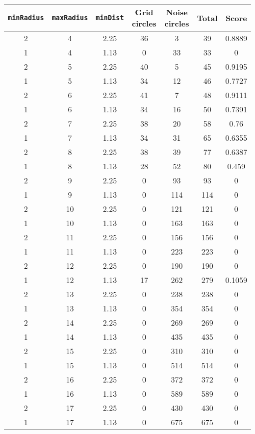 \documentclass[letterpaper, 12pt]{article}
\begin{document}
\begin{longtable}{|c|c|c|c|c|c|c|}
\hline
\textbf{\texttt{minRadius}} & \textbf{\texttt{maxRadius}} & \textbf{\texttt{minDist}} & \textbf{Grid circles} & \textbf{Noise circles} & \textbf{Total} & \textbf{Score} \\
\hline
2 & 4 & 2.25 & 36 & 3 & 39 & 0.8889 \\
\hline
1 & 4 & 1.13 & 0 & 33 & 33 & 0 \\
\hline
2 & 5 & 2.25 & 40 & 5 & 45 & 0.9195 \\
\hline
1 & 5 & 1.13 & 34 & 12 & 46 & 0.7727 \\
\hline
2 & 6 & 2.25 & 41 & 7 & 48 & 0.9111 \\
\hline
1 & 6 & 1.13 & 34 & 16 & 50 & 0.7391 \\
\hline
2 & 7 & 2.25 & 38 & 20 & 58 & 0.76 \\
\hline
1 & 7 & 1.13 & 34 & 31 & 65 & 0.6355 \\
\hline
2 & 8 & 2.25 & 38 & 39 & 77 & 0.6387 \\
\hline
1 & 8 & 1.13 & 28 & 52 & 80 & 0.459 \\
\hline
2 & 9 & 2.25 & 0 & 93 & 93 & 0 \\
\hline
1 & 9 & 1.13 & 0 & 114 & 114 & 0 \\
\hline
2 & 10 & 2.25 & 0 & 121 & 121 & 0 \\
\hline
1 & 10 & 1.13 & 0 & 163 & 163 & 0 \\
\hline
2 & 11 & 2.25 & 0 & 156 & 156 & 0 \\
\hline
1 & 11 & 1.13 & 0 & 223 & 223 & 0 \\
\hline
2 & 12 & 2.25 & 0 & 190 & 190 & 0 \\
\hline
1 & 12 & 1.13 & 17 & 262 & 279 & 0.1059 \\
\hline
2 & 13 & 2.25 & 0 & 238 & 238 & 0 \\
\hline
1 & 13 & 1.13 & 0 & 354 & 354 & 0 \\
\hline
2 & 14 & 2.25 & 0 & 269 & 269 & 0 \\
\hline
1 & 14 & 1.13 & 0 & 435 & 435 & 0 \\
\hline
2 & 15 & 2.25 & 0 & 310 & 310 & 0 \\
\hline
1 & 15 & 1.13 & 0 & 514 & 514 & 0 \\
\hline
2 & 16 & 2.25 & 0 & 372 & 372 & 0 \\
\hline
1 & 16 & 1.13 & 0 & 589 & 589 & 0 \\
\hline
2 & 17 & 2.25 & 0 & 430 & 430 & 0 \\
\hline
1 & 17 & 1.13 & 0 & 675 & 675 & 0 \\

\end{longtable}
\end{document}

